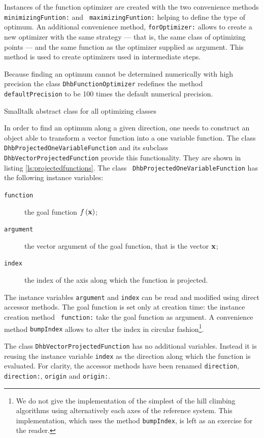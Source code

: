 \documentclass[twoside]{book}
\begin{document}
Instances of the function optimizer are created with the two
convenience methods {\tt minimizingFuntion:} and {\tt
maximizingFuntion:} helping to define the type of optimum. An
additional convenience method, {\tt forOptimizer:} allows to
create a new optimizer with the same strategy --- that is, the
same class of optimizing points --- and the same function as the
optimizer supplied as argument. This method is used to create
optimizers used in intermediate steps.

Because finding an optimum cannot be determined numerically with
high precision \cite{Press} the class {\tt DhbFunctionOptimizer}
redefines the method {\tt defaultPrecision} to be 100 times the
default numerical precision.
\begin{listing} Smalltalk abstract class for all optimizing classes \label{ls:optimizerAbstract}

\end{listing}

In order to find an optimum along a given direction, one needs to
construct an object able to transform a vector function into a one
variable function. The class {\tt DhbProjectedOneVariableFunction}
and its subclass {\tt DhbVectorProjectedFunction} provide this
functionality. They are shown in listing
\ref{ls:projectedfunctions}. The class {\tt
DhbProjectedOneVariableFunction} has the following instance
variables:
\begin{description}
  \item[\tt function] the goal function $f\left({\bf x}\right)$;
  \item[\tt argument] the vector argument of the goal function,
  that is the vector ${\bf x}$;
  \item[\tt index] the index of the axis along which the function
  is projected.
\end{description}
The instance variables {\tt argument} and {\tt index} can be read
and modified using direct accessor methods. The goal function is
set only at creation time: the instance creation method {\tt
function:} take the goal function as argument. A convenience
method {\tt bumpIndex} allows to alter the index in circular
fashion\footnote{We do not give the implementation of the simplest
of the hill climbing algorithms using alternatively each axes of
the reference system. This implementation, which uses the method
{\tt bumpIndex}, is left as an exercise for the reader.}.

The class {\tt DhbVectorProjectedFunction} has no additional
variables. Instead it is reusing the instance variable {\tt index}
as the direction along which the function is evaluated. For
clarity, the accessor methods have been renamed {\tt direction},
{\tt direction:}, {\tt origin} and {\tt origin:}.
\end{document}
